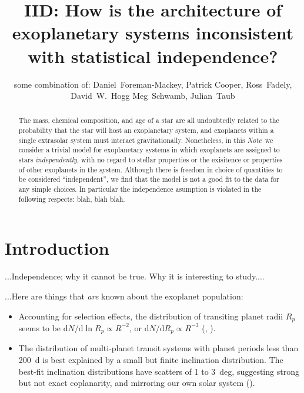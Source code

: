 \documentclass[12pt, preprint]{aastex}
\newcommand{\documentname}{\textsl{Note}}
\renewcommand{\d}{\mathrm{d}}
\begin{document}
\title{IID: How is the architecture of exoplanetary systems inconsistent with statistical independence?}
\author{
  some combination of:
  Daniel~Foreman-Mackey,
  Patrick Cooper,
  Ross~Fadely,
  David~W.~Hogg
  Meg~Schwamb,
  Julian~Taub
}

\begin{abstract}
  The mass, chemical composition, and age of a star are all
  undoubtedly related to the probability that the star will host an
  exoplanetary system, and exoplanets within a single extrasolar
  system must interact gravitationally.  Nonetheless, in this
  \documentname\ we consider a trivial model for exoplanetary systems
  in which exoplanets are assigned to stars \emph{independently}, with
  no regard to stellar properties or the exisitence or properties of
  other exoplanets in the system.  Although there is freedom in choice
  of quantities to be considered ``independent'', we find that the
  model is not a good fit to the data for any simple choices.  In
  particular the independence asumption is violated in the following
  respects: blah, blah blah.
\end{abstract}


\section{Introduction}

...Independence; why it cannot be true.  Why it is interesting to study....

...Here are things that \emph{are} known about the exoplanet population:
\begin{itemize}
\item
Accounting for selection effects, the distribution of transiting
planet radii $R_p$ seems to be $\d N / \d\ln R_p\propto R^{-2}$,
or $\d N/ \d R_p\propto R^{-3}$ (\citealt{howard}, \citealt{youdin}).
\item
The distribution of multi-planet transit systems with planet periods
less than 200~d is best explained by a small but finite inclination
distribution.  The best-fit inclination distributions have scatters of
1 to 3~deg, suggesting strong but not exact coplanarity, and mirroring
our own solar system (\citealt{fang}).
\end{itemize}
\end{document}
